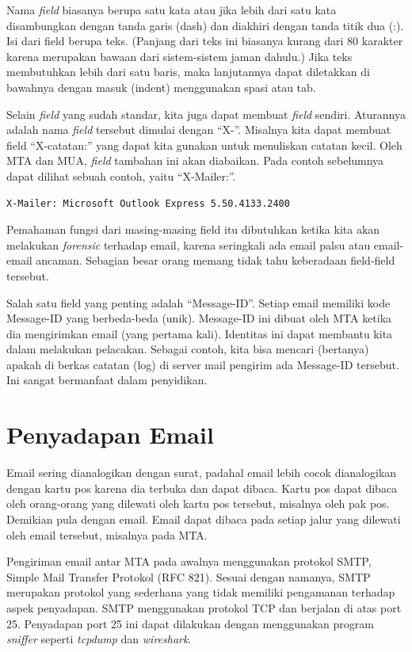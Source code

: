 Nama {\em field} biasanya berupa satu kata atau jika lebih dari satu kata
disambungkan dengan tanda garis (dash) dan diakhiri dengan tanda titik dua (:).
Isi dari field berupa teks. (Panjang dari teks ini biasanya kurang dari 80
karakter karena merupakan bawaan dari sistem-sistem jaman dahulu.) Jika teks
membutuhkan lebih dari satu baris, maka lanjutannya dapat diletakkan di
bawahnya dengan masuk (indent) menggunakan spasi atau tab.

Selain {\em field} yang sudah standar, kita juga dapat membuat {\em field}
sendiri. Aturannya adalah nama {\em field} tersebut dimulai dengan ``X-''.
Misalnya kita dapat membuat field ``X-catatan:'' yang dapat kita gunakan untuk
menuliskan catatan kecil. Oleh MTA dan MUA, {\em field} tambahan ini akan
diabaikan. Pada contoh sebelumnya dapat dilihat sebuah contoh, yaitu
``X-Mailer:''.

\begin{verbatim}
X-Mailer: Microsoft Outlook Express 5.50.4133.2400
\end{verbatim}

Pemahaman fungsi dari masing-masing field itu dibutuhkan ketika kita akan
melakukan {\em forensic} terhadap email, karena seringkali ada email palsu atau
email-email ancaman. Sebagian besar orang memang tidak tahu keberadaan
field-field tersebut.

Salah satu field yang penting adalah ``Message-ID''. Setiap email memiliki kode
Message-ID yang berbeda-beda (unik). Message-ID ini dibuat oleh MTA ketika dia
mengirimkan email (yang pertama kali). Identitas ini dapat membantu kita dalam
melakukan pelacakan. Sebagai contoh, kita bisa mencari (bertanya) apakah di
berkas catatan (log) di server mail pengirim ada Message-ID tersebut. Ini
sangat bermanfaat dalam penyidikan.

\section{Penyadapan Email}
Email sering dianalogikan dengan surat, padahal email lebih cocok dianalogikan
dengan kartu pos karena dia terbuka dan dapat dibaca. Kartu pos dapat dibaca
oleh orang-orang yang dilewati oleh kartu pos tersebut, misalnya oleh pak pos.
Demikian pula dengan email. Email dapat dibaca pada setiap jalur yang dilewati
oleh email tersebut, misalnya pada MTA.

Pengiriman email antar MTA pada awalnya menggunakan protokol SMTP, Simple Mail
Transfer Protokol (RFC 821). Sesuai dengan namanya, SMTP merupakan protokol
yang sederhana yang tidak memiliki pengamanan terhadap aspek penyadapan. SMTP
menggunakan protokol TCP dan berjalan di atas port 25. Penyadapan port 25 ini
dapat dilakukan dengan menggunakan program {\em sniffer} seperti {\em tcpdump}
dan {\em wireshark}.

